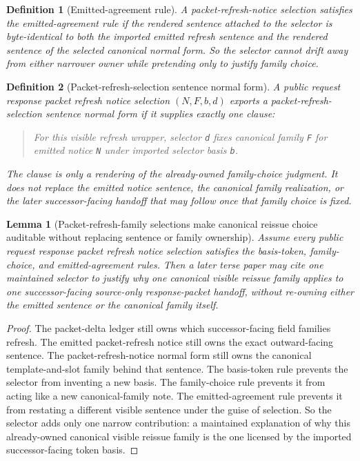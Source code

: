 \documentclass[11pt]{article}
\newtheorem{definition}{Definition}
\newtheorem{lemma}{Lemma}
\begin{document}
\begin{definition}[Emitted-agreement rule]
A packet-refresh-notice selection satisfies the \emph{emitted-agreement rule} if the rendered sentence attached to the selector is byte-identical to both the imported emitted refresh sentence and the rendered sentence of the selected canonical normal form. So the selector cannot drift away from either narrower owner while pretending only to justify family choice.
\end{definition}

\begin{definition}[Packet-refresh-selection sentence normal form]
A public request response packet refresh notice selection \((N,F,b,d)\) exports a \emph{packet-refresh-selection sentence normal form} if it supplies exactly one clause:
\begin{quote}\small
For this visible refresh wrapper, selector \texttt{d} fixes canonical family \texttt{F} for emitted notice \texttt{N} under imported selector basis \texttt{b}.
\end{quote}
The clause is only a rendering of the already-owned family-choice judgment. It does not replace the emitted notice sentence, the canonical family realization, or the later successor-facing handoff that may follow once that family choice is fixed.
\end{definition}

\begin{lemma}[Packet-refresh-family selections make canonical reissue choice auditable without replacing sentence or family ownership]
Assume every public request response packet refresh notice selection satisfies the basis-token, family-choice, and emitted-agreement rules. Then a later terse paper may cite one maintained selector to justify why one canonical visible reissue family applies to one successor-facing source-only response-packet handoff, without re-owning either the emitted sentence or the canonical family itself.
\end{lemma}

\begin{proof}
The packet-delta ledger still owns which successor-facing field families refresh. The emitted packet-refresh notice still owns the exact outward-facing sentence. The packet-refresh-notice normal form still owns the canonical template-and-slot family behind that sentence. The basis-token rule prevents the selector from inventing a new basis. The family-choice rule prevents it from acting like a new canonical-family note. The emitted-agreement rule prevents it from restating a different visible sentence under the guise of selection. So the selector adds only one narrow contribution: a maintained explanation of why this already-owned canonical visible reissue family is the one licensed by the imported successor-facing token basis.\qedhere
\end{proof}
\end{document}
